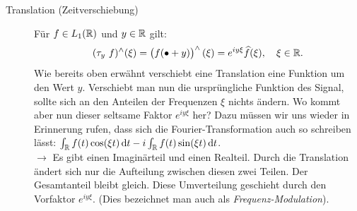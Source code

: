 \begin{remark}
\begin{description}
		\item [Translation (Zeitverschiebung)] Für $ f \in L_1(\mathbb{R}) $ und $ y \in \mathbb{R} $ gilt:
		\[ 
    		(\tau_{y} \ f)^{\wedge}(\xi) 
  		= \left( f(\bullet + y) \right)^{\wedge}(\xi) 
  		= e^{iy\xi}\widehat{f}(\xi), \quad \xi \in \mathbb{R}.
    \]
		Wie bereits oben erwähnt verschiebt eine Translation eine Funktion um den Wert $ y $. 
		Verschiebt man nun die ursprüngliche Funktion des Signal, sollte sich an den Anteilen der 
		Frequenzen $ \xi $ nichts ändern. Wo kommt aber nun dieser seltsame Faktor $ e^{iy\xi} $ her? 
		Dazu müssen wir uns wieder in Erinnerung rufen, dass sich die Fourier-Transformation auch so 
		schreiben lässt: $ \int_{\R} f(t) \cos(\xi t) \dif t - i \int_{\R} f(t) \sin(\xi t) \dif t $.\\
		$ \rightarrow $ Es gibt einen Imaginärteil und einen Realteil. Durch die Translation ändert 
		sich nur die Aufteilung zwischen diesen zwei Teilen. Der Gesamtanteil bleibt gleich. Diese 
		Umverteilung geschieht durch den Vorfaktor $ e^{iy\xi} $. (Dies bezeichnet man auch als
		\emph{Frequenz-Modulation}).
		

\end{description}
\end{remark}
